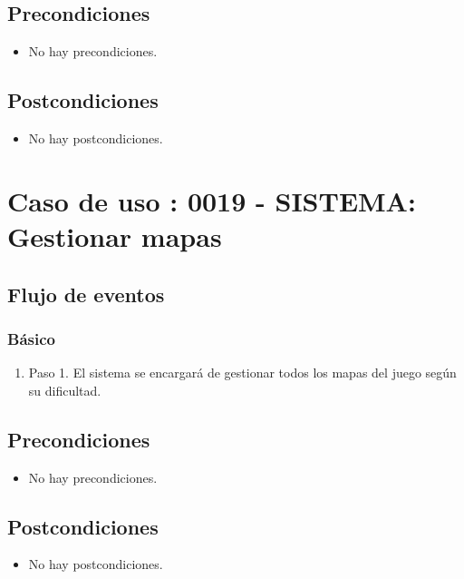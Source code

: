 \subsection{Precondiciones}
\begin{itemize}
\item No hay precondiciones.
\end{itemize}

\subsection{Postcondiciones}
\begin{itemize}
\item No hay postcondiciones.
\end{itemize}



\section{Caso de uso : 0019 - SISTEMA: Gestionar mapas}\label{sec:uc0}
\subsection{Flujo de eventos}
\subsubsection{Básico}

\begin{enumerate}
\item Paso 1.
El sistema se encargará de gestionar todos los mapas del juego según su dificultad.
\end{enumerate}

\subsection{Precondiciones}
\begin{itemize}
\item No hay precondiciones.
\end{itemize}

\subsection{Postcondiciones}
\begin{itemize}
\item No hay postcondiciones.
\end{itemize}




